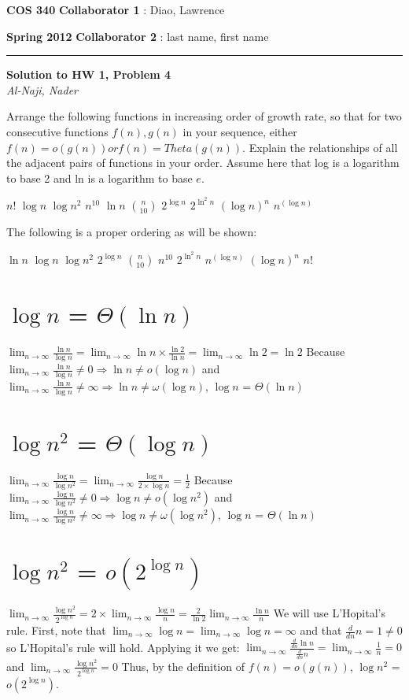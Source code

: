 \documentclass[12pt]{article}
\newcommand{\myheader}[4]
{\vspace*{-0.5in}
\noindent
{#1} \hfill {#3}

\noindent
{#2} \hfill {#4}

\noindent
\rule[8pt]{\textwidth}{1pt}

\vspace{1ex} 
}  %
\newcommand{\myalgsheader}[0]
{\myheader
{ {\bf{COS 340}} }
{ {\bf{Spring 2012}} }
{ {\bf{Collaborator 1}} : Diao, Lawrence }
{ {\bf{Collaborator 2}} : last name, first name}
}
\newcommand{\myhwtitle}[3]
{\begin{center}
{\large {\bf Solution to HW {#1}, Problem {#2}}}\\
\medskip 
{\it {#3}} %
\end{center}}
\begin{document}
\pagebreak
\myalgsheader
\pagestyle{plain}
\myhwtitle{1}{4}{Al-Naji, Nader}
\bigskip

Arrange the following functions in increasing order of growth rate, so that for two consecutive functions $f(n), g(n)$ in your sequence, either $f(n) = o(g(n)) or f(n) = Theta(g(n)).$
Explain the relationships of all the adjacent pairs of functions in your order. Assume here that log is a logarithm to base 2 and ln is a logarithm to base $e$.
\begin{center}
\Large $n!$  $\log n$  $\log n^2$  $n^{10}$  $\ln n$  $n \choose 10$  $2^{\log n}$  $2^{\ln^2 n}$  $(\log n)^n$  $n^{(\log n)}$
\end{center}
The following is a proper ordering as will be shown:
\begin{center}
\Large $\ln n$ $\log n$ $\log n^2$ $2^{\log n}$ $n \choose 10$ $n^{10}$ $2^{\ln^2 n}$ $n^{(\log n)}$ $(\log n)^n$ $n!$
\end{center}
\section{$\log n$ = $\Theta(\ln n)$}
$\lim_{n\to\infty} \frac{\ln n}{\log n} = \lim_{n\to\infty} \ln n \times \frac{\ln 2}{\ln n} = \lim_{n\to\infty} \ln 2 = \ln 2$
\newline
Because $\lim_{n\to\infty} \frac{\ln n}{\log n} \neq 0 \Rightarrow \ln n \neq o(\log n)$
\newline
and $\lim_{n\to\infty} \frac{\ln n}{\log n} \neq \infty \Rightarrow \ln n \neq \omega(\log n)$,
\newline
$\log n$ = $\Theta(\ln n)$
\section{$\log n^2$ = $\Theta(\log n)$}
$\lim_{n\to\infty} \frac{\log n}{\log n^2} = \lim_{n\to\infty} \frac{\log n}{2 \times \log n} = \frac{1}{2}$
\newline
Because $\lim_{n\to\infty} \frac{\log n}{\log n^2} \neq 0 \Rightarrow \log n \neq o(\log n^2)$
\newline
and $\lim_{n\to\infty} \frac{\log n}{\log n^2} \neq \infty \Rightarrow \log n \neq \omega(\log n^2)$,
\newline
$\log n$ = $\Theta(\ln n)$
\section{$\log n^2$ = $o(2^{\log n})$}
$\lim_{n\to\infty} \frac{\log n^2}{2^{\log n}} = 2 \times \lim_{n\to\infty} \frac{\log n}{n} = \frac{2}{\ln 2} \lim_{n\to\infty} \frac{\ln n}{n}$
\newline
We will use L'Hopital's rule. First, note that $\lim_{n\to\infty} \log n = \lim_{n\to\infty} \log n  = \infty$
and that $\frac{d}{dn} n = 1 \neq 0$ so L'Hopital's rule will hold. Applying it we get:
\newline
$\lim_{n\to\infty} \frac{\frac{d}{dn}\ln n}{\frac{d}{dn}n} = \lim_{n\to\infty} \frac{1}{n} = 0$ and $\lim_{n\to\infty} \frac{\log n^2}{2^{\log n}} = 0$
\newline
Thus, by the definition of $f(n) = o(g(n))$, $\log n^2$ = $o(2^{\log n})$.
\newline
\end{document}
